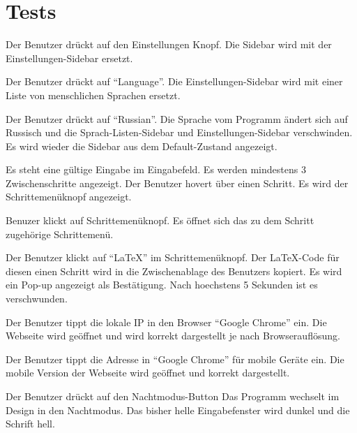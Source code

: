\documentclass[parskip=full,11pt,twoside]{scrartcl}
\begin{document}
\newpage
\section{Tests}

{Der Benutzer drückt auf den Einstellungen Knopf.}
{Die Sidebar wird mit der Einstellungen-Sidebar ersetzt.}

{Der Benutzer drückt auf \enquote{Language}.}
{Die Einstellungen-Sidebar wird mit einer Liste von menschlichen Sprachen ersetzt.}

{Der Benutzer drückt auf \enquote{Russian}.}
{Die Sprache vom Programm ändert sich auf Russisch und die Sprach-Listen-Sidebar und
Einstellungen-Sidebar verschwinden. Es wird wieder die Sidebar aus dem Default-Zustand angezeigt.}

\teststep
{Es steht eine gültige Eingabe im Eingabefeld.
Es werden mindestens 3 Zwischenschritte angezeigt.}
{Der Benutzer hovert über einen Schritt.}
{Es wird der Schrittemenüknopf angezeigt.}

{Benuzer klickt auf Schrittemenüknopf.}
{Es öffnet sich das zu dem Schritt zugehörige Schrittemenü.}

{Der Benutzer klickt auf \enquote{LaTeX} im Schrittemenüknopf.}
{Der LaTeX-Code für diesen einen Schritt wird in die Zwischenablage des Benutzers kopiert.
Es wird ein Pop-up angezeigt als Bestätigung. Nach hoechstens 5 Sekunden ist es verschwunden.}

{Der Benutzer tippt die lokale IP in den Browser \enquote {Google Chrome} ein.}
{Die Webseite wird geöffnet und wird korrekt dargestellt je nach Browserauflösung.}

{Der Benutzer tippt die Adresse in \enquote{Google Chrome} für mobile Geräte ein.}
{Die mobile Version der Webseite wird geöffnet und korrekt dargestellt.}

{Der Benutzer drückt auf den Nachtmodus-Button}
{Das Programm wechselt im Design in den Nachtmodus. Das bisher helle Eingabefenster wird dunkel und die Schrift hell.}
\end{document}

